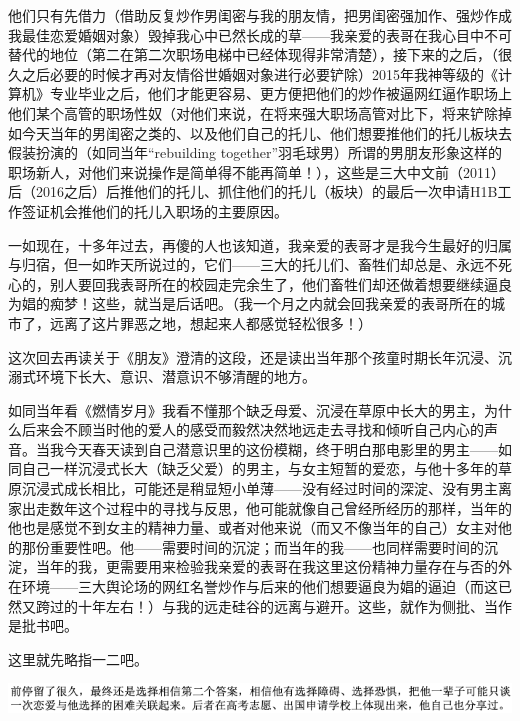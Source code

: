 \documentclass[9pt, b5paper]{article}
\begin{document}
他们只有先借力（借助反复炒作男闺密与我的朋友情，把男闺密强加作、强炒作成我最佳恋爱婚姻对象）毁掉我心中已然长成的草——我亲爱的表哥在我心目中不可替代的地位（第二在第二次职场电梯中已经体现得非常清楚），接下来的之后，（很久之后必要的时候才再对友情俗世婚姻对象进行必要铲除）2015年我神等级的《计算机》专业毕业之后，他们才能更容易、更方便把他们的炒作被逼网红逼作职场上他们某个高管的职场性奴（对他们来说，在将来强大职场高管对比下，将来铲除掉如今天当年的男闺密之类的、以及他们自己的托儿、他们想要推他们的托儿板块去假装扮演的（如同当年“rebuilding together”羽毛球男）所谓的男朋友形象这样的职场新人，对他们来说操作是简单得不能再简单！），这些是三大中文前（2011）后（2016之后）后推他们的托儿、抓住他们的托儿（板块）的最后一次申请H1B工作签证机会推他们的托儿入职场的主要原因。 

一如现在，十多年过去，再傻的人也该知道，我亲爱的表哥才是我今生最好的归属与归宿，但一如昨天所说过的，它们——三大的托儿们、畜牲们却总是、永远不死心的，别人要回我表哥所在的校园走完余生了，他们畜牲们却还做着想要继续逼良为娼的痴梦！这些，就当是后话吧。（我一个月之内就会回我亲爱的表哥所在的城市了，远离了这片罪恶之地，想起来人都感觉轻松很多！） 

这次回去再读关于《朋友》澄清的这段，还是读出当年那个孩童时期长年沉浸、沉溺式环境下长大、意识、潜意识不够清醒的地方。

如同当年看《燃情岁月》我看不懂那个缺乏母爱、沉浸在草原中长大的男主，为什么后来会不顾当时他的爱人的感受而毅然决然地远走去寻找和倾听自己内心的声音。当我今天春天读到自己潜意识里的这份模糊，终于明白那电影里的男主——如同自己一样沉浸式长大（缺乏父爱）的男主，与女主短暂的爱恋，与他十多年的草原沉浸式成长相比，可能还是稍显短小单薄——没有经过时间的深淀、没有男主离家出走数年这个过程中的寻找与反思，他可能就像自己曾经所经历的那样，当年的他也是感觉不到女主的精神力量、或者对他来说（而又不像当年的自己）女主对他的那份重要性吧。他——需要时间的沉淀；而当年的我——也同样需要时间的沉淀，当年的我，更需要用来检验我亲爱的表哥在我这里这份精神力量存在与否的外在环境——三大舆论场的网红名誉炒作与后来的他们想要逼良为娼的逼迫（而这已然又跨过的十年左右！）与我的远走硅谷的远离与避开。这些，就作为侧批、当作是批书吧。

这里就先略指一二吧。 

\begin{center}
\includegraphics[width=.9\linewidth]{./pic/backups_plans_20210501_123806.png}
\end{center}
\end{document}
